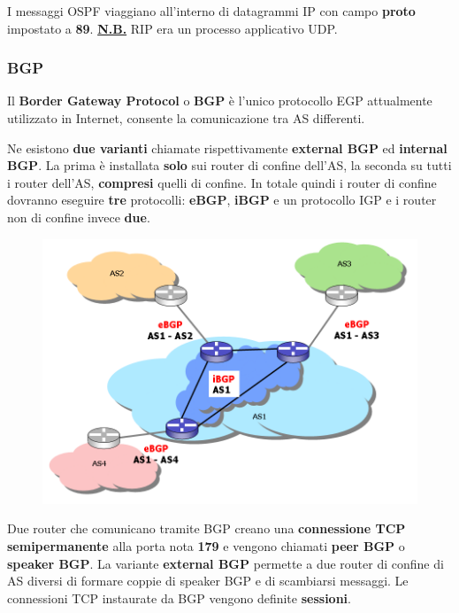 \documentclass[11pt,a4paper,oneside]{book}
\theoremstyle{definition}
\begin{document}
I messaggi OSPF viaggiano all'interno di datagrammi IP con campo \textbf{proto} impostato a \textbf{89}. \textbf{\underline{N.B.}} RIP era un processo applicativo UDP.

\pagebreak

\subsubsection{BGP}
Il \textbf{Border Gateway Protocol} o \textbf{BGP} è l'unico protocollo EGP attualmente utilizzato in Internet, consente la comunicazione tra AS differenti.

Ne esistono \textbf{due varianti} chiamate rispettivamente \textbf{external BGP} ed \textbf{internal BGP}. La prima è installata \textbf{solo} sui router di confine dell'AS, la seconda su tutti i router dell'AS, \textbf{compresi} quelli di confine. In totale quindi i router di confine dovranno eseguire \textbf{tre} protocolli: \textbf{eBGP}, \textbf{iBGP} e un protocollo IGP e i router non di confine invece \textbf{due}.

\begin{figure}[!h]
	\centering
	\includegraphics[scale=0.25]{Immagini/ieBGP.png}
\end{figure}

Due router che comunicano tramite BGP creano una \textbf{connessione TCP semipermanente} alla porta nota \textbf{179} e vengono chiamati \textbf{peer BGP} o \textbf{speaker BGP}. La variante \textbf{external BGP} permette a due router di confine di AS diversi di formare coppie di speaker BGP e di scambiarsi messaggi. Le connessioni TCP instaurate da BGP vengono definite \textbf{sessioni}.
\end{document}
